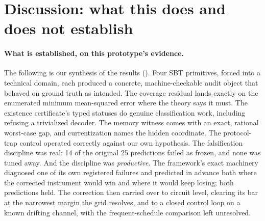 \section{Discussion: what this does and does not establish}
\label{sec:discussion}

\paragraph{What is established, on this prototype's evidence.} The following is our synthesis of the results (\gInterp). Four SBT primitives, forced into a technical domain, each produced a concrete, machine-checkable audit object that behaved on ground truth as intended. The coverage residual lands exactly on the enumerated minimum mean-squared error where the theory says it must. The existence certificate's typed statuses do genuine classification work, including refusing a trivialized decoder. The memory witness comes with an exact, rational worst-case gap, and currentization names the hidden coordinate. The protocol-trap control operated correctly against our own hypothesis. %
The falsification discipline was real: 14 of the original 25 predictions failed as frozen, and none was tuned away. %
And the discipline was \emph{productive}. The framework's exact machinery diagnosed one of its own registered failures and predicted in advance both where the corrected instrument would win and where it would keep losing; both predictions held. The correction then carried over to circuit level, clearing its bar at the narrowest margin the grid resolves, and to a closed control loop on a known drifting channel, with the frequent-schedule comparison left unresolved. %

